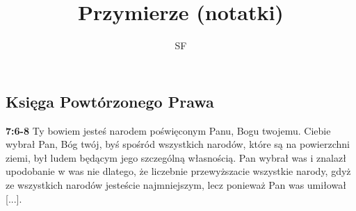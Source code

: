 \documentclass[a4paper,11pt]{article}
\title{Przymierze (notatki)}
\author{SF}
\newcommand{\paddr}[1]{\textbf{#1}}
\begin{document}
\begin{fussy}

\maketitle
\tableofcontents

\section{Księga Powtórzonego Prawa}

\paddr{7:6-8} Ty bowiem jesteś narodem poświęconym Panu, Bogu twojemu. Ciebie wybrał Pan, Bóg twój, byś spośród wszystkich narodów, które są na powierzchni ziemi, był ludem będącym jego szczególną własnością. Pan wybrał was i znalazł upodobanie w was nie dlatego, że liczebnie przewyższacie wszystkie narody, gdyż ze wszystkich narodów jesteście najmniejszym, lecz ponieważ Pan was umiłował [...].

\end{fussy}
\end{document}
